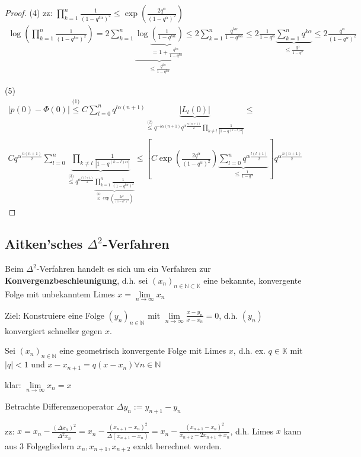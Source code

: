 \begin{proof}
	(4) zz: $\prod_{k=1}^{n} \frac{1}{(1-q^{k\alpha})^2} \leq \exp\left(\frac{2q^\alpha}{(1-q^\alpha)^2}\right)$
	\begin{align*}
		\log\left(\prod_{k=1}^{n} \frac{1}{(1-q^{k\alpha})^2}\right) = 2 \sum_{k=1}^{n} \underbrace{\log\underbrace{\left(\frac{1}{1-q^{k\alpha}}\right)}_{= 1 + \frac{q^{k\alpha}}{1-q^{k\alpha}}}}_{\leq \frac{q^{k\alpha}}{1-q^{k\alpha}}} \leq
		2 \sum_{k=1}^{n} \frac{q^{k\alpha}}{1-q^{k\alpha}} \leq
		2 \frac{1}{1-q^\alpha} \underbrace{\sum_{k=1}^{n} q^{k\alpha}}_{\leq \frac{q^\alpha}{1-q^\alpha}} \leq
		2 \frac{q^\alpha}{(1-q^\alpha)^2}
	\end{align*}
	
	(5) \begin{align*}
		|p(0) - \Phi(0)| \overset{\text{(1)}}{\leq} C \sum_{l=0}^{n} q^{l\alpha(n+1)} \underbrace{|L_l(0)|}_{\overset{\text{(2)}}{\leq} q^{-l\alpha(n+1)} q^{\alpha \frac{n(n+1)}{2}} \prod_{k\neq l} \frac{1}{|1-q^{(k-l)\alpha}|}} \leq\\
		C q^{\alpha \frac{n(n+1)}{2}} \sum_{l=0}^{n} \underbrace{\prod_{k\neq l} \frac{1}{|1-q^{(k-l)\alpha}|}}_{\overset{\text{(3)}}{\leq} q^{\alpha \frac{l(l+1)}{2}} \underbrace{\prod_{k=1}^{n} \frac{1}{(1-q^{k\alpha})^2}}_{\overset{\text{(4)}}{\leq} \exp\left(\frac{2q^\alpha}{(1-q^\alpha)^2}\right)  }} \leq
		\left[C \exp\left(\frac{2q^\alpha}{(1-q^{\alpha})^2}\right) \underbrace{\sum_{l=0}^{n} q^{\alpha \frac{l(l+1)}{2}}}_{\leq \frac{1}{1-q^\alpha}} \right] q^{\alpha \frac{n(n+1)}{2}}
	\end{align*}
\end{proof}

\subsection{Aitken'sches $\Delta^2$-Verfahren}

Beim $\Delta^2$-Verfahren handelt es sich um ein Verfahren zur \textbf{Konvergenzbeschleunigung}, d.h. sei $(x_n)_{n \in \mathbb{N} \subset \mathbb{K}}$ eine bekannte, konvergente Folge mit unbekanntem Limes $x = \lim\limits_{n\rightarrow\infty} x_n$

Ziel: Konstruiere eine Folge $(y_n)_{n\in \mathbb{N}}$ mit $\lim\limits_{n\rightarrow\infty} \frac{x-y_n}{x-x_n} = 0$, d.h. $(y_n)$ konvergiert schneller gegen $x$.

\begin{remark}
	Sei $(x_n)_{n\in \mathbb{N}}$ eine geometrisch konvergente Folge mit Limes $x$, d.h. ex. $q \in \mathbb{K}$ mit $|q| < 1$ und $x-x_{n+1} = q(x-x_n) \forall n \in \mathbb{N}$
	
	klar: $\lim\limits_{n\rightarrow\infty} x_n = x$
	
	Betrachte Differenzenoperator $\Delta y_n := y_{n+1} - y_n$
	
	zz: $x = x_n - \frac{(\Delta x_n)^2}{\Delta^2x_n} = x_n - \frac{(x_{n+1} - x_n)^2}{\Delta(x_{n+1} - x_n)} = x_n - \frac{(x_{n+1} - x_n)^2}{x_{n+2} - 2x_{n+1} + x_n}$, d.h. Limes $x$ kann aus 3 Folgegliedern $x_n, x_{n+1}, x_{n+2}$ exakt berechnet werden.
\end{remark}

